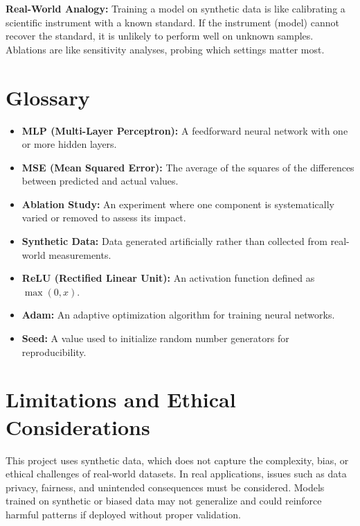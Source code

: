 \documentclass[11pt]{article}
\begin{document}
\textbf{Real-World Analogy:} Training a model on synthetic data is like calibrating a scientific instrument with a known standard. If the instrument (model) cannot recover the standard, it is unlikely to perform well on unknown samples. Ablations are like sensitivity analyses, probing which settings matter most.


\section*{Glossary}
\begin{itemize}
  \item \textbf{MLP (Multi-Layer Perceptron):} A feedforward neural network with one or more hidden layers.
  \item \textbf{MSE (Mean Squared Error):} The average of the squares of the differences between predicted and actual values.
  \item \textbf{Ablation Study:} An experiment where one component is systematically varied or removed to assess its impact.
  \item \textbf{Synthetic Data:} Data generated artificially rather than collected from real-world measurements.
  \item \textbf{ReLU (Rectified Linear Unit):} An activation function defined as $\max(0, x)$.
  \item \textbf{Adam:} An adaptive optimization algorithm for training neural networks.
  \item \textbf{Seed:} A value used to initialize random number generators for reproducibility.
\end{itemize}

\section*{Limitations and Ethical Considerations}
This project uses synthetic data, which does not capture the complexity, bias, or ethical challenges of real-world datasets. In real applications, issues such as data privacy, fairness, and unintended consequences must be considered. Models trained on synthetic or biased data may not generalize and could reinforce harmful patterns if deployed without proper validation.

\end{document}
